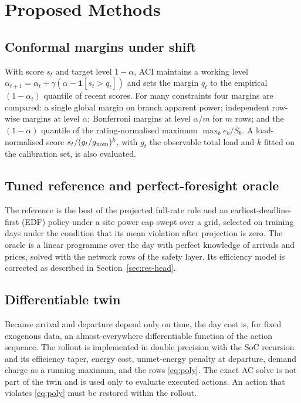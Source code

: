 \documentclass[11pt]{article}
\begin{document}
\section{Proposed Methods}\label{sec:methods}
\subsection{Conformal margins under shift}
With score $s_t$ and target level $1-\alpha$, ACI maintains a working level $\alpha_{t+1}=\alpha_t+\gamma(\alpha-\mathbf 1[s_t>q_t])$ and sets the margin $q_t$ to the empirical $(1-\alpha_t)$ quantile of recent scores. For many constraints four margins are compared: a single global margin on branch apparent power; independent row-wise margins at level $\alpha$; Bonferroni margins at level $\alpha/m$ for $m$ rows; and the $(1-\alpha)$ quantile of the rating-normalised maximum $\max_b e_b/\bar S_b$. A load-normalised score $s_t/(g_t/g_{\rm nom})^{k}$, with $g_t$ the observable total load and $k$ fitted on the calibration set, is also evaluated.

\subsection{Tuned reference and perfect-foresight oracle}
The reference is the best of the projected full-rate rule and an earliest-deadline-first (EDF) policy under a site power cap swept over a grid, selected on training days under the condition that its mean violation after projection is zero. The oracle is a linear programme over the day with perfect knowledge of arrivals and prices, solved with the network rows of the safety layer. Its efficiency model is corrected as described in Section~\ref{sec:res-head}.

\subsection{Differentiable twin}
Because arrival and departure depend only on time, the day cost is, for fixed exogenous data, an almost-everywhere differentiable function of the action sequence. The rollout is implemented in double precision with the SoC recursion and its efficiency taper, energy cost, unmet-energy penalty at departure, demand charge as a running maximum, and the rows \eqref{eq:poly}. The exact AC solve is not part of the twin and is used only to evaluate executed actions. An action that violates \eqref{eq:poly} must be restored within the rollout.
\end{document}
